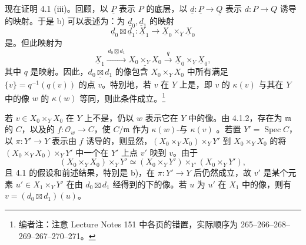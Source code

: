 现在证明 4.1 (iii)。回顾，以 $\underline P$ 表示 $P$ 的底层，以 $\underline d:\underline P\to\underline Q$ 表示 $d:P\to Q$ 诱导的映射。于是 b) 可以表述为：为 $\underline d_0,\underline d_1$ 的映射
\[\underline d_0\boxtimes\underline d_1:\underline X_1\longrightarrow\underline X_0\times_{\underline Y}\underline X_0\]
是。但此映射为
\[\underline X_1\xrightarrow{\,\underline{d_0\boxtimes d_1}\,}\underline{X_0\times_YX_0}\xrightarrow{\ q\ }\underline X_0\times_{\underline Y}\underline X_0,\]
其中 $q$ 是映射。因此，$\underline{d_0\boxtimes d_1}$ 的像包含 $X_0\times_YX_0$ 中所有满足 $\{v\}=q^{-1}(q(v))$ 的点 $v$。特别地，若 $v$ 在 $Y$ 上是，即 $v$ 的 $\kappa(v)$ 与其在 $Y$ 中的像 $w$ 的 $\kappa(w)$ 等同，则此条件成立。\footnote{编者注：注意 Lecture Notes 151 中各页的错置，实际顺序为 265--266--268--269--267--270--271。}

若 $v\in X_0\times_YX_0$ 在 $Y$ 上不是，仍以 $w$ 表示它在 $Y$ 中的像。由 4.1.2，存在为 $\mathfrak m$ 的 $C$，以及的 $f:\mathcal O_w\to C$，使 $C/\mathfrak m$ 作为 $\kappa(w)$-与 $\kappa(v)$ 。若置 $Y'=\operatorname{Spec}C$，以 $\pi:Y'\to Y$ 表示由 $f$ 诱导的，则显然，$(X_0\times_YX_0)\times_YY'$ 到 $X_0\times_YX_0$ 的将 $(X_0\times_YX_0)\times_YY'$ 中一个在 $Y'$ 上点 $v'$ 映到 $v$。由于
\[(X_0\times_YX_0)\times_YY'\simeq(X_0\times_YY')\times_{Y'}(X_0\times_YY'),\]
且 4.1 的假设和前述结果，特别是 b)，在 $\pi:Y'\to Y$ 后仍然成立，故 $v'$ 是某个元素 $u'\in X_1\times_YY'$ 在由 $d_0\boxtimes d_1$ 经得到的下的像。若 $u$ 为 $u'$ 在 $X_1$ 中的像，则有 $v=(d_0\boxtimes d_1)(u)$。

